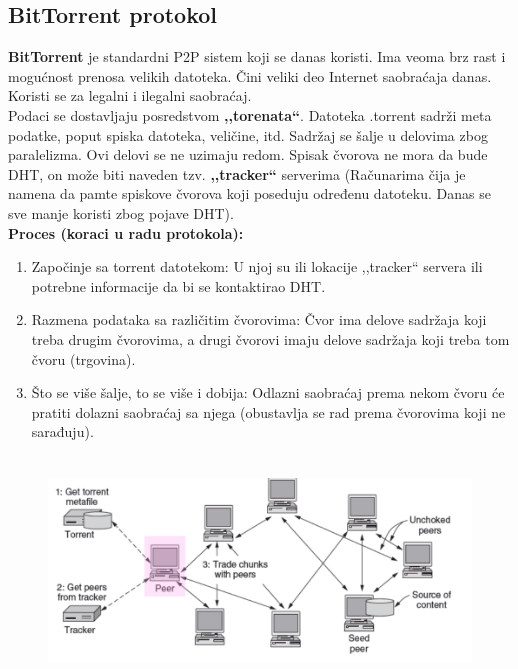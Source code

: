 \documentclass[a4paper]{article}
\begin{document}
    \subsection{BitTorrent protokol}
        \textbf{BitTorrent} je standardni P2P sistem koji se danas koristi. Ima veoma brz rast
        i mogućnost prenosa velikih datoteka. Čini veliki deo Internet saobraćaja danas. Koristi se
        za legalni i ilegalni saobraćaj.\\
        \indent Podaci se dostavljaju posredstvom \textbf{,,torenata``}. Datoteka .torrent sadrži
        meta podatke, poput spiska datoteka, veličine, itd. Sadržaj se šalje u delovima zbog 
        paralelizma. Ovi delovi se ne uzimaju redom. Spisak čvorova ne mora da bude DHT, on može
        biti naveden tzv. \textbf{,,tracker``} serverima (Računarima čija je namena da pamte spiskove
        čvorova koji poseduju određenu datoteku. Danas se sve manje koristi zbog pojave DHT).\\
        \textbf{Proces (koraci u radu protokola):}
        \begin{enumerate}
            \item Započinje sa torrent datotekom: U njoj su ili lokacije ,,tracker`` servera
                  ili potrebne informacije da bi se kontaktirao DHT.
            \item Razmena podataka sa različitim čvorovima: Čvor ima delove sadržaja koji
                  treba drugim čvorovima, a drugi čvorovi imaju delove sadržaja koji treba
                  tom čvoru (trgovina).
            \item Što se više šalje, to se više i dobija: Odlazni saobraćaj prema nekom čvoru
                  će pratiti dolazni saobraćaj sa njega (obustavlja se rad prema čvorovima
                  koji ne sarađuju). 
        \end{enumerate}
        \begin{figure}[H]
            \begin{center}
                \includegraphics[width=120mm,height=60mm]{Slike/p2p2.png}
            \end{center}
        \end{figure}
\end{document}

